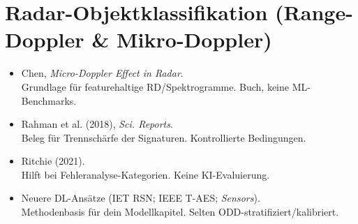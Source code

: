 \section{Radar-Objektklassifikation (Range-Doppler \& Mikro-Doppler)}
\begin{itemize}
  \item Chen, \textit{Micro-Doppler Effect in Radar}.\\
      {Grundlage für featurehaltige RD/Spektrogramme.}
      {Buch, keine ML-Benchmarks.}

  \item Rahman et al. (2018), \textit{Sci. Reports}.\\
      {Beleg für Trennschärfe der Signaturen.}
      {Kontrollierte Bedingungen.}

  \item Ritchie (2021).\\
      {Hilft bei Fehleranalyse-Kategorien.}
      {Keine KI-Evaluierung.}

  \item Neuere DL-Ansätze (IET RSN; IEEE T-AES; \textit{Sensors}).\\
      {Methodenbasis für dein Modellkapitel.}
      {Selten ODD-stratifiziert/kalibriert.}
\end{itemize}

